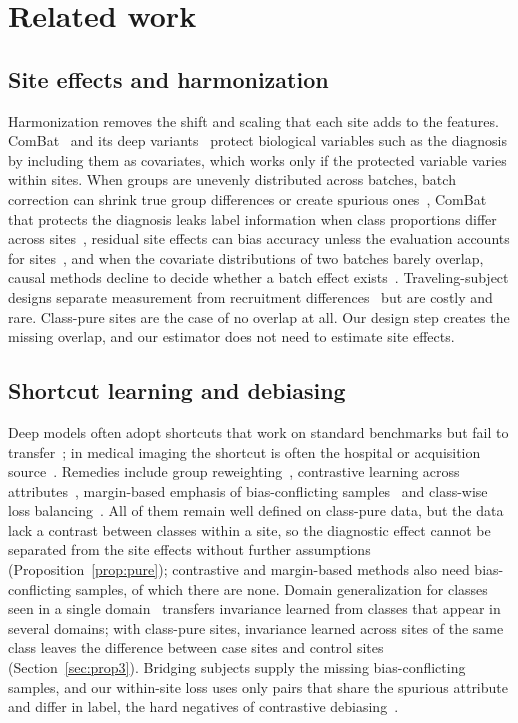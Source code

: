 \section{Related work}\label{sec:related}

\subsection{Site effects and harmonization}

Harmonization removes the shift and scaling that each site adds to the features. ComBat~\cite{johnson2007,fortin2018} and its deep variants~\cite{an2025deepresbat} protect biological variables such as the diagnosis by including them as covariates, which works only if the protected variable varies within sites. When groups are unevenly distributed across batches, batch correction can shrink true group differences or create spurious ones~\cite{nygaard2016}, ComBat that protects the diagnosis leaks label information when class proportions differ across sites~\cite{nieto2026}, residual site effects can bias accuracy unless the evaluation accounts for sites~\cite{solanes2021}, and when the covariate distributions of two batches barely overlap, causal methods decline to decide whether a batch effect exists~\cite{bridgeford2025}. Traveling-subject designs separate measurement from recruitment differences~\cite{yamashita2019} but are costly and rare. Class-pure sites are the case of no overlap at all. Our design step creates the missing overlap, and our estimator does not need to estimate site effects.

\subsection{Shortcut learning and debiasing}

Deep models often adopt shortcuts that work on standard benchmarks but fail to transfer~\cite{geirhos2020}; in medical imaging the shortcut is often the hospital or acquisition source~\cite{zech2018,degrave2021}. Remedies include group reweighting~\cite{sagawa2020}, contrastive learning across attributes~\cite{zhang2022cnc}, margin-based emphasis of bias-conflicting samples~\cite{wang2025mdn} and class-wise loss balancing~\cite{zuo2026}. All of them remain well defined on class-pure data, but the data lack a contrast between classes within a site, so the diagnostic effect cannot be separated from the site effects without further assumptions (Proposition~\ref{prop:pure}); contrastive and margin-based methods also need bias-conflicting samples, of which there are none. Domain generalization for classes seen in a single domain~\cite{kaai2025fond} transfers invariance learned from classes that appear in several domains; with class-pure sites, invariance learned across sites of the same class leaves the difference between case sites and control sites (Section~\ref{sec:prop3}). Bridging subjects supply the missing bias-conflicting samples, and our within-site loss uses only pairs that share the spurious attribute and differ in label, the hard negatives of contrastive debiasing~\cite{zhang2022cnc}.

